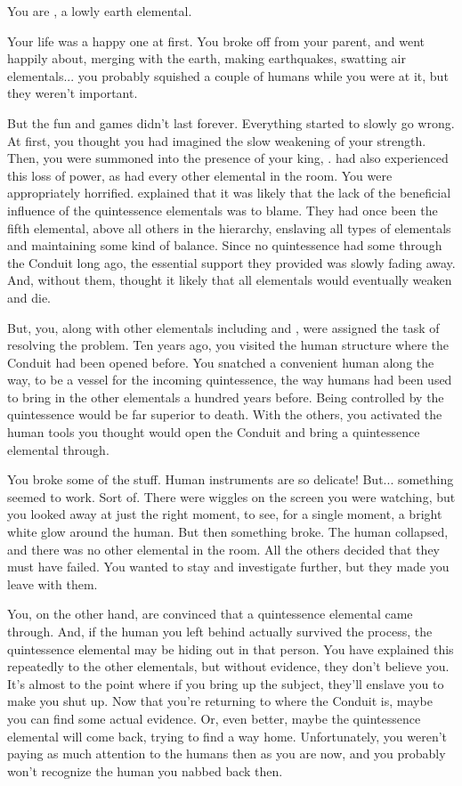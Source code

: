 \documentclass[char]{elementals}
\begin{document}
\name{\cMinion{}}

You are \cMinion{\intro}, a lowly earth elemental.

Your life was a happy one at first.  You broke off from your parent, and went happily about, merging with the earth, making earthquakes, swatting air elementals... you probably squished a couple of humans while you were at it, but they weren't important.

But the fun and games didn't last forever.  Everything started to slowly go wrong.  At first, you thought you had imagined the slow weakening of your strength.  Then, you were summoned into the presence of your king, \cEarthKing{}.  \cEarthKing{\They} had also experienced this loss of power, as had every other elemental in the room.  You were appropriately horrified.  \cEarthKing{} explained that it was likely that the lack of the beneficial influence of the quintessence elementals was to blame.  They had once been the fifth elemental, above all others in the hierarchy, enslaving all types of elementals and maintaining some kind of balance.  Since no quintessence had some through the Conduit long ago, the essential support they provided was slowly fading away.  And, without them, \cEarthKing{} thought it likely that all elementals would eventually weaken and die.

But, you, along with other elementals including \cLoyal{} and \cRogue{}, were assigned the task of resolving the problem.  Ten years ago, you visited the human structure where the Conduit had been opened before.  You snatched a convenient human along the way, to be a vessel for the incoming quintessence, the way humans had been used to bring in the other elementals a hundred years before.  Being controlled by the quintessence would be far superior to death.  With the others, you activated the human tools you thought would open the Conduit and bring a quintessence elemental through.

You broke some of the stuff.  Human instruments are so delicate!  But... something seemed to work.  Sort of.  There were wiggles on the screen you were watching, but you looked away at just the right moment, to see, for a single moment, a bright white glow around the human.  But then something broke.  The human collapsed, and there was no other elemental in the room.  All the others decided that they must have failed.  You wanted to stay and investigate further, but they made you leave with them.

You, on the other hand, are convinced that a quintessence elemental came through.  And, if the human you left behind actually survived the process, the quintessence elemental may be hiding out in that person.  You have explained this repeatedly to the other elementals, but without evidence, they don't believe you.  It's almost to the point where if you bring up the subject, they'll enslave you to make you shut up.  Now that you're returning to where the Conduit is, maybe you can find some actual evidence.  Or, even better, maybe the quintessence elemental will come back, trying to find a way home.  Unfortunately, you weren't paying as much attention to the humans then as you are now, and you probably won't recognize the human you nabbed back then.
\end{document}
